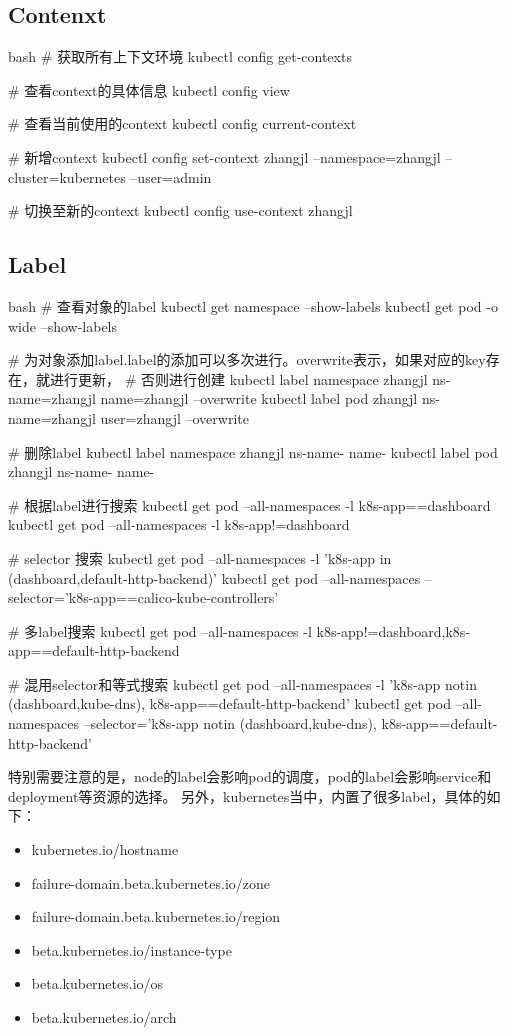 \subsection{Contenxt}
\begin{code-block}{bash}
# 获取所有上下文环境
kubectl config get-contexts

# 查看context的具体信息
kubectl config view

# 查看当前使用的context
kubectl config current-context

# 新增context
kubectl config set-context zhangjl --namespace=zhangjl --cluster=kubernetes --user=admin

# 切换至新的context
kubectl config use-context zhangjl

\end{code-block}

\subsection{Label}
\begin{code-block}{bash}
# 查看对象的label
kubectl get namespace --show-labels
kubectl get pod -o wide --show-labels

# 为对象添加label.label的添加可以多次进行。overwrite表示，如果对应的key存在，就进行更新，
# 否则进行创建
kubectl label namespace zhangjl ns-name=zhangjl name=zhangjl --overwrite
kubectl label pod zhangjl ns-name=zhangjl user=zhangjl --overwrite

# 删除label
kubectl label namespace zhangjl ns-name- name-
kubectl label pod zhangjl ns-name- name-

# 根据label进行搜索
kubectl get pod --all-namespaces  -l k8s-app==dashboard
kubectl get pod --all-namespaces  -l k8s-app!=dashboard

# selector 搜索
kubectl get pod --all-namespaces  -l 'k8s-app in (dashboard,default-http-backend)'
kubectl get pod --all-namespaces --selector='k8s-app==calico-kube-controllers'

# 多label搜索
kubectl get pod --all-namespaces  -l k8s-app!=dashboard,k8s-app==default-http-backend

# 混用selector和等式搜索
kubectl get pod --all-namespaces  -l 'k8s-app notin (dashboard,kube-dns), k8s-app==default-http-backend'
kubectl get pod --all-namespaces  --selector='k8s-app notin (dashboard,kube-dns), k8s-app==default-http-backend'
\end{code-block}
特别需要注意的是，node的label会影响pod的调度，pod的label会影响service和deployment等资源的选择。
另外，kubernetes当中，内置了很多label，具体的如下：
\begin{itemize}
    \item kubernetes.io/hostname
    \item failure-domain.beta.kubernetes.io/zone
    \item failure-domain.beta.kubernetes.io/region
    \item beta.kubernetes.io/instance-type
    \item beta.kubernetes.io/os
    \item beta.kubernetes.io/arch
\end{itemize}

